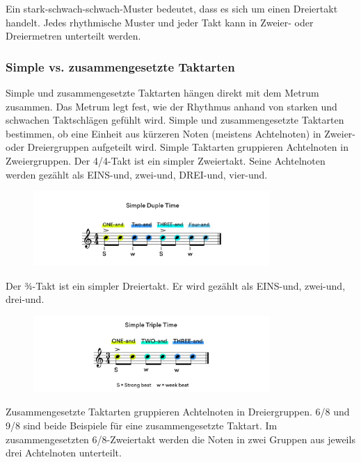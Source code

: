 Ein stark-schwach-schwach-Muster bedeutet, dass es sich um einen Dreiertakt handelt. Jedes rhythmische Muster und jeder Takt kann in Zweier- oder Dreiermetren unterteilt werden.

\subsubsection{Simple vs. zusammengesetzte Taktarten}
Simple und zusammengesetzte Taktarten hängen direkt mit dem Metrum zusammen. Das Metrum legt fest, wie der Rhythmus anhand von starken und schwachen Taktschlägen gefühlt wird. Simple und zusammengesetzte Taktarten bestimmen, ob eine Einheit aus kürzeren Noten (meistens Achtelnoten) in Zweier- oder Dreiergruppen aufgeteilt wird. Simple Taktarten gruppieren Achtelnoten in Zweiergruppen. Der 4/4-Takt ist ein simpler Zweiertakt. Seine Achtelnoten werden gezählt als EINS-und, zwei-und, DREI-und, vier-und.

\begin{figure}[H]
    \centering
    \includegraphics[width=0.8\textwidth]{images/Rythm_body_6}
\end{figure}

Der ¾-Takt ist ein simpler Dreiertakt. Er wird gezählt als EINS-und, zwei-und, drei-und.

\begin{figure}[H]
    \centering
    \includegraphics[width=0.8\textwidth]{images/Rythm_body_7}
\end{figure}

Zusammengesetzte Taktarten gruppieren Achtelnoten in Dreiergruppen. 6/8 und 9/8 sind beide Beispiele für eine zusammengesetzte Taktart. Im zusammengesetzten 6/8-Zweiertakt werden die Noten in zwei Gruppen aus jeweils drei Achtelnoten unterteilt.

